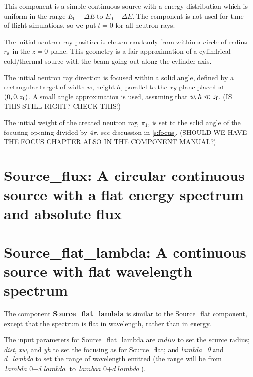 This component is 
a simple continuous source with a energy distribution which is uniform
in the range $E_0 - \Delta E$ to $E_0 + \Delta E$.
The component is not used for time-of-flight simulations,
so we put $t=0$ for all neutron rays.

The initial neutron ray position is chosen randomly from within a
circle of radius $r_{\rm s}$ in the $z=0$ plane. 
This geometry is a fair approximation
of a cylindrical cold/thermal source with the beam going out along
the cylinder axis.

The initial neutron ray direction is focused within
a solid angle, defined by a rectangular target of width
$w$, height $h$, parallel to 
the $xy$ plane placed at $(0,0,z_{\rm f})$. 
A small angle approximation is used, assuming that 
$w,h \ll z_{\rm f}$. (IS THIS STILL RIGHT? CHECK THIS!)

The initial weight of the created neutron ray, $\pi_1$, is set to the
solid angle of the focusing opening divided by $4\pi$,
see discussion in \ref{s:focus}. (SHOULD WE HAVE THE FOCUS CHAPTER ALSO
IN THE COMPONENT MANUAL?)

\section{Source\_flux: A circular continuous source with a flat energy spectrum and absolute flux}
\label{source-flux}

\section{Source\_flat\_lambda: A continuous source with flat
  wavelength spectrum}
\label{source-flat-lambda}


The component {\bf Source\_flat\_lambda} is similar to the Source\_flat
component, except that the spectrum is flat in wavelength, rather
than in energy.

The input parameters for Source\_flat\_lambda are \textit{radius} to set
the source radius; \textit{dist}, \textit{xw}, and \textit{yh}
to set the focusing as for Source\_flat; and \textit{lambda\_0} and
\textit{d\_lambda} to set the range of wavelength emitted (the range
will be from $\textit{lambda\_0} - \textit{d\_lambda}$ to
$\textit{lambda\_0} + \textit{d\_lambda}$).

